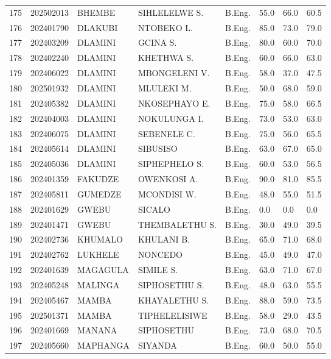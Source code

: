 \documentclass[12pt]{article}
\begin{document}
\begin{longtable}{@{}llllllll@{}}
175 & 202502013 & BHEMBE & SIHLELELWE S. & B.Eng. & 55.0 & 66.0 & 60.5 \\
176 & 202401790 & DLAKUBI & NTOBEKO L. & B.Eng. & 85.0 & 73.0 & 79.0 \\
177 & 202403209 & DLAMINI & GCINA S. & B.Eng. & 80.0 & 60.0 & 70.0 \\
178 & 202402240 & DLAMINI & KHETHWA S. & B.Eng. & 60.0 & 66.0 & 63.0 \\
179 & 202406022 & DLAMINI & MBONGELENI V. & B.Eng. & 58.0 & 37.0 & 47.5 \\
180 & 202501932 & DLAMINI & MLULEKI M. & B.Eng. & 50.0 & 68.0 & 59.0 \\
181 & 202405382 & DLAMINI & NKOSEPHAYO E. & B.Eng. & 75.0 & 58.0 & 66.5 \\
182 & 202404003 & DLAMINI & NOKULUNGA I. & B.Eng. & 73.0 & 53.0 & 63.0 \\
183 & 202406075 & DLAMINI & SEBENELE C. & B.Eng. & 75.0 & 56.0 & 65.5 \\
184 & 202405614 & DLAMINI & SIBUSISO & B.Eng. & 63.0 & 67.0 & 65.0 \\
185 & 202405036 & DLAMINI & SIPHEPHELO S. & B.Eng. & 60.0 & 53.0 & 56.5 \\
186 & 202401359 & FAKUDZE & OWENKOSI A. & B.Eng. & 90.0 & 81.0 & 85.5 \\
187 & 202405811 & GUMEDZE & MCONDISI W. & B.Eng. & 48.0 & 55.0 & 51.5 \\
188 & 202401629 & GWEBU & SICALO & B.Eng. & 0.0 & 0.0 & 0.0 \\
189 & 202401471 & GWEBU & THEMBALETHU S. & B.Eng. & 30.0 & 49.0 & 39.5 \\
190 & 202402736 & KHUMALO & KHULANI B. & B.Eng. & 65.0 & 71.0 & 68.0 \\
191 & 202402762 & LUKHELE & NONCEDO & B.Eng. & 45.0 & 49.0 & 47.0 \\
192 & 202401639 & MAGAGULA & SIMILE S. & B.Eng. & 63.0 & 71.0 & 67.0 \\
193 & 202405248 & MALINGA & SIPHOSETHU S. & B.Eng. & 48.0 & 63.0 & 55.5 \\
194 & 202405467 & MAMBA & KHAYALETHU S. & B.Eng. & 88.0 & 59.0 & 73.5 \\
195 & 202501371 & MAMBA & TIPHELELISIWE & B.Eng. & 58.0 & 29.0 & 43.5 \\
196 & 202401669 & MANANA & SIPHOSETHU & B.Eng. & 73.0 & 68.0 & 70.5 \\
197 & 202405660 & MAPHANGA & SIYANDA & B.Eng. & 60.0 & 50.0 & 55.0 \\

\end{longtable}
\end{document}
